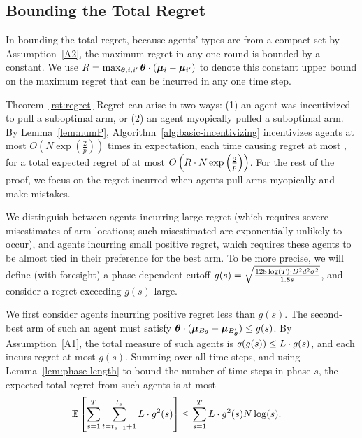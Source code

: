 \subsection{Bounding the Total Regret}
In bounding the total regret, because agents' types are from a compact
set by Assumption~\ref{A2}, the maximum regret in any one round is
bounded by a constant.
We use $R = \max_{\bm{\theta}, i,i'} \bm{\theta} \cdot (\bm{\mu}_{i} - \bm{\mu}_{i'})$
to denote this constant upper bound on the maximum regret that can be
incurred in any one time step. 


\begin{emptyextraproof}{Theorem~\ref{rst:regret}}
Regret can arise in two ways:
(1) an agent was incentivized to pull a suboptimal arm, or
(2) an agent myopically pulled a suboptimal arm.
By Lemma~\ref{lem:numP}, Algorithm~\ref{alg:basic-incentivizing}
incentivizes agents at most 
$O\left( N\exp\left(\frac{2}{p}\right) \right)$
times in expectation, each time causing regret at most \MAXR,
for a total expected regret of at most
$O\left(R\cdot N\exp\left(\frac{2}{p}\right) \right)$.
For the rest of the proof, we focus on the regret incurred when agents
pull arms myopically and make mistakes.

We distinguish between agents incurring large regret
(which requires severe misestimates of arm locations;
such misestimated are exponentially unlikely to occur), 
and agents incurring small positive regret,
which requires these agents to be almost tied in their preference for
the best arm.
To be more precise, we will define (with foresight) a phase-dependent
cutoff
$g(s) = \sqrt{\frac{128\log(T) \cdot D^2 d^2 \sigma^2}{1.8 s}}$,
and consider a regret exceeding $g(s)$ large.

We first consider agents \AgV incurring positive regret less than $g(s)$.
The second-best arm \Second{\AgV} of such an agent \AgV must satisfy
$\bm{\theta} \cdot (\bm{\mu}_{B_{\bm{\theta}}} - \bm{\mu}_{B'_{\bm{\theta}}}) \leq g(s)$.
By Assumption~\ref{A1},
the total measure of such agents
is $q(g(s)) \leq L \cdot g(s)$,
and each incurs regret at most $g(s)$.
Summing over all time steps,
and using Lemma~\ref{lem:phase-length} to bound the number of time
steps in phase $s$, 
the expected total regret from such agents is at most
\begin{align}
\Expect{\sum_{s=1}^{T} \sum_{t=t_{s-1}+1}^{t_{s}} \TieDensity \cdot g^2(s)}
& \leq \sum_{s=1}^{T} \TieDensity \cdot g^2(s) \ARMNUM \log(s).
\label{equ:small_regret_bound}
\end{align}


\end{emptyextraproof}
